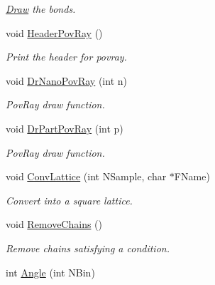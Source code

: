 \begin{DoxyCompactItemize}
\begin{DoxyCompactList}\small\item\em \hyperlink{classDraw}{\-Draw} the bonds. \end{DoxyCompactList}\item 
\hypertarget{classElPoly_a79715be09324f2b58cc98385a5f62e7b}{void \hyperlink{classElPoly_a79715be09324f2b58cc98385a5f62e7b}{\-Header\-Pov\-Ray} ()}\label{classElPoly_a79715be09324f2b58cc98385a5f62e7b}

\begin{DoxyCompactList}\small\item\em \-Print the header for povray. \end{DoxyCompactList}\item 
\hypertarget{classElPoly_a760f4fa1edbecc53d532140617dbf8ab}{void \hyperlink{classElPoly_a760f4fa1edbecc53d532140617dbf8ab}{\-Dr\-Nano\-Pov\-Ray} (int n)}\label{classElPoly_a760f4fa1edbecc53d532140617dbf8ab}

\begin{DoxyCompactList}\small\item\em \-Pov\-Ray draw function. \end{DoxyCompactList}\item 
\hypertarget{classElPoly_aedbaa04884ac62d32f3cce78fdfd92b8}{void \hyperlink{classElPoly_aedbaa04884ac62d32f3cce78fdfd92b8}{\-Dr\-Part\-Pov\-Ray} (int p)}\label{classElPoly_aedbaa04884ac62d32f3cce78fdfd92b8}

\begin{DoxyCompactList}\small\item\em \-Pov\-Ray draw function. \end{DoxyCompactList}\item 
\hypertarget{classElPoly_a3e03070150b93328661ff2c857eebbf4}{void \hyperlink{classElPoly_a3e03070150b93328661ff2c857eebbf4}{\-Conv\-Lattice} (int \-N\-Sample, char $\ast$\-F\-Name)}\label{classElPoly_a3e03070150b93328661ff2c857eebbf4}

\begin{DoxyCompactList}\small\item\em \-Convert into a square lattice. \end{DoxyCompactList}\item 
\hypertarget{classElPoly_abfd537703af91a0dceb86c6bba5bd213}{void \hyperlink{classElPoly_abfd537703af91a0dceb86c6bba5bd213}{\-Remove\-Chains} ()}\label{classElPoly_abfd537703af91a0dceb86c6bba5bd213}

\begin{DoxyCompactList}\small\item\em \-Remove chains satisfying a condition. \end{DoxyCompactList}\item 
\hypertarget{classElPoly_ae3aab8086f988eecdd12b8f29f45a56a}{int \hyperlink{classElPoly_ae3aab8086f988eecdd12b8f29f45a56a}{\-Angle} (int \-N\-Bin)}\label{classElPoly_ae3aab8086f988eecdd12b8f29f45a56a}


\end{DoxyCompactItemize}
